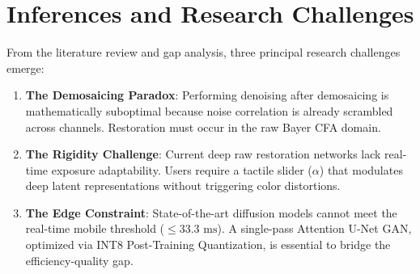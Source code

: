 \begin{table}[t]
\centering
\caption{Comparative Analysis: Existing LLIE Paradigms vs. Proposed LumaCam Architecture}
\label{tab:gap_analysis}
\end{table}

\section{Inferences and Research Challenges}
From the literature review and gap analysis, three principal research challenges emerge:
\begin{enumerate}
    \item \textbf{The Demosaicing Paradox}: Performing denoising after demosaicing is mathematically suboptimal because noise correlation is already scrambled across channels. Restoration must occur in the raw Bayer CFA domain.
    \item \textbf{The Rigidity Challenge}: Current deep raw restoration networks lack real-time exposure adaptability. Users require a tactile slider ($\alpha$) that modulates deep latent representations without triggering color distortions.
    \item \textbf{The Edge Constraint}: State-of-the-art diffusion models cannot meet the real-time mobile threshold ($\le 33.3\text{ ms}$). A single-pass Attention U-Net GAN, optimized via INT8 Post-Training Quantization, is essential to bridge the efficiency-quality gap.
\end{enumerate}
